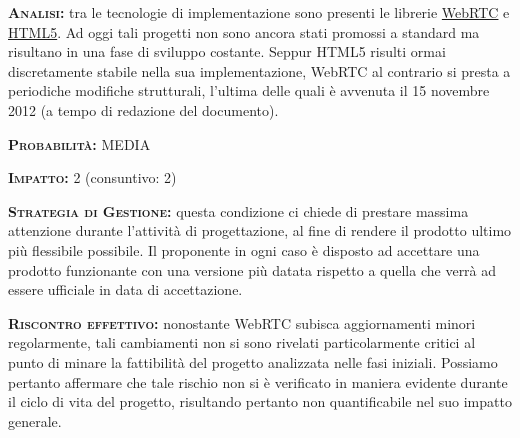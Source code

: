 \begin{description}
	\item{\scshape\bfseries Analisi:} tra le tecnologie di implementazione sono presenti le librerie \underline{WebRTC} e \underline{HTML5}. Ad oggi tali progetti non sono ancora stati promossi a standard ma risultano in una fase di sviluppo costante. Seppur HTML5 risulti ormai discretamente stabile nella sua implementazione, WebRTC al contrario si presta a periodiche modifiche strutturali, l'ultima delle quali è avvenuta il 15 novembre 2012 (a tempo di redazione del documento).
	\item{\scshape\bfseries Probabilità:} MEDIA
	\item{\scshape\bfseries Impatto:} 2 (consuntivo: 2)
	\item{\scshape\bfseries Strategia di Gestione:} questa condizione ci chiede di prestare massima attenzione durante l'attività di progettazione, al fine di rendere il prodotto ultimo più flessibile possibile. Il proponente in ogni caso è disposto ad accettare una prodotto funzionante con una versione più datata rispetto a quella che verrà ad essere ufficiale in data di accettazione.
	\item{\scshape\bfseries Riscontro effettivo:} nonostante WebRTC subisca aggiornamenti minori regolarmente, tali cambiamenti non si sono rivelati particolarmente critici al punto di minare la fattibilità del progetto analizzata nelle fasi iniziali. Possiamo pertanto affermare che tale rischio non si è verificato in maniera evidente durante il ciclo di vita del progetto, risultando pertanto non quantificabile nel suo impatto generale.
\end{description}

